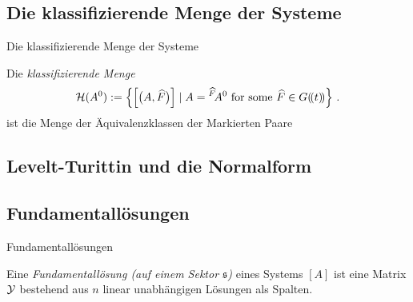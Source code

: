\subsection{Die klassifizierende Menge der Systeme}
\begin{frame}[t]{Die klassifizierende Menge der Systeme}
  \begin{defn}
    Die \emph{klassifizierende Menge}
    \[
      \mathcal{H}(A^0):=\left\{\left[\bigl(A,\widehat F\bigl)\right]
        \mid A={}^{\widehat F}\!A^0 \text{ for some } \widehat F\in G(\!(t)\!)\right\} \,.
    \]
    ist die Menge der Äquivalenzklassen der Markierten Paare \TODO[\dots]
  \end{defn}
\end{frame}

\subsection{Levelt-Turittin und die Normalform}


\subsection{Fundamentallösungen}
\begin{frame}[t]{Fundamentallösungen}
  \TODO[nötig?]
  \begin{defn}
    Eine \emph{Fundamentallösung (auf einem Sektor \boldmath$\mathfrak{s}$)}
    eines Systems $[A]$ ist eine Matrix $\mathcal{Y}$ bestehend aus $n$ linear
    unabhängigen Lösungen als Spalten.
  \end{defn}
\end{frame}

